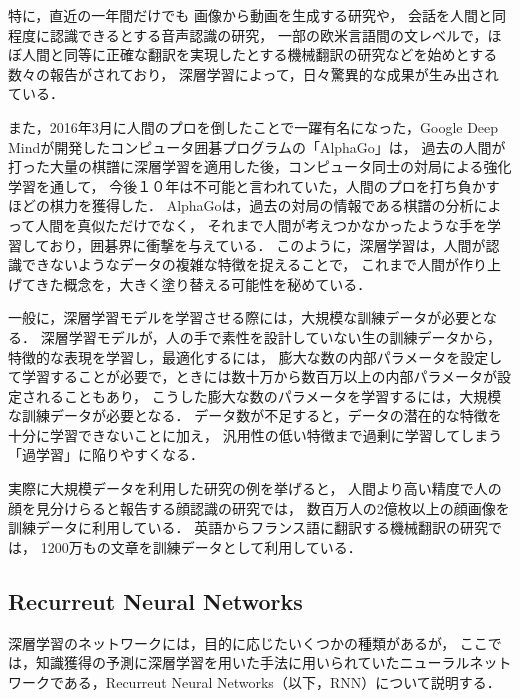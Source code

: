 特に，直近の一年間だけでも
画像から動画を生成する研究\cite{vondrick2016generating}や，
会話を人間と同程度に認識できるとする音声認識の研究\cite{xiong2016achieving}，
一部の欧米言語間の文レベルで，ほぼ人間と同等に正確な翻訳を実現したとする機械翻訳の研究\cite{wu2016google}などを始めとする数々の報告がされており，
深層学習によって，日々驚異的な成果が生み出されている．

また，2016年3月に人間のプロを倒したことで一躍有名になった，Google Deep Mindが開発したコンピュータ囲碁プログラムの「AlphaGo」\cite{silver2016mastering}は，
過去の人間が打った大量の棋譜に深層学習を適用した後，コンピュータ同士の対局による強化学習を通して，
今後１０年は不可能と言われていた，人間のプロを打ち負かすほどの棋力を獲得した．
AlphaGoは，過去の対局の情報である棋譜の分析によって人間を真似ただけでなく，
それまで人間が考えつかなかったような手を学習しており，囲碁界に衝撃を与えている．
このように，深層学習は，人間が認識できないようなデータの複雑な特徴を捉えることで，
これまで人間が作り上げてきた概念を，大きく塗り替える可能性を秘めている．


一般に，深層学習モデルを学習させる際には，大規模な訓練データが必要となる．
深層学習モデルが，人の手で素性を設計していない生の訓練データから，特徴的な表現を学習し，最適化するには，
膨大な数の内部パラメータを設定して学習することが必要で，ときには数十万から数百万以上の内部パラメータが設定されることもあり，
こうした膨大な数のパラメータを学習するには，大規模な訓練データが必要となる．
データ数が不足すると，データの潜在的な特徴を十分に学習できないことに加え，
汎用性の低い特徴まで過剰に学習してしまう「過学習」に陥りやすくなる\cite{tetko1995neural}．

実際に大規模データを利用した研究の例を挙げると，
人間より高い精度で人の顔を見分けらると報告する顔認識の研究\cite{schroff2015facenet}では，
数百万人の2億枚以上の顔画像を訓練データに利用している．
英語からフランス語に翻訳する機械翻訳の研究\cite{xu2015show}では，
1200万もの文章を訓練データとして利用している．


\subsection{Recurreut Neural Networks}
深層学習のネットワークには，目的に応じたいくつかの種類があるが，
ここでは，知識獲得の予測に深層学習を用いた手法\cite{piech2015deep}に用いられていたニューラルネットワークである，Recurreut Neural Networks\cite{williams1989learning}（以下，RNN）について説明する．


